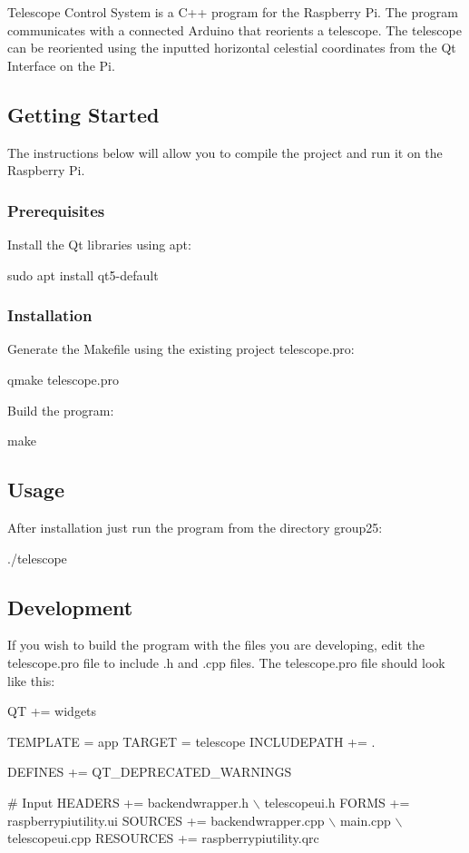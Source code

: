 Telescope Control System is a C++ program for the Raspberry Pi. The program communicates with a connected Arduino that reorients a telescope. The telescope can be reoriented using the inputted horizontal celestial coordinates from the Qt Interface on the Pi.

\subsection*{Getting Started}

The instructions below will allow you to compile the project and run it on the Raspberry Pi.

\subsubsection*{Prerequisites}

Install the Qt libraries using {\ttfamily apt}\+: 
\begin{DoxyCode}
sudo apt install qt5-default
\end{DoxyCode}


\subsubsection*{Installation}

Generate the {\ttfamily Makefile} using the existing project {\ttfamily telescope.\+pro}\+: 
\begin{DoxyCode}
qmake telescope.pro
\end{DoxyCode}


Build the program\+: 
\begin{DoxyCode}
make
\end{DoxyCode}


\subsection*{Usage}

After installation just run the program from the directory {\ttfamily group25}\+: 
\begin{DoxyCode}
./telescope
\end{DoxyCode}


\subsection*{Development}

If you wish to build the program with the files you are developing, edit the {\ttfamily telescope.\+pro} file to include {\ttfamily .h} and {\ttfamily .cpp} files. The {\ttfamily telescope.\+pro} file should look like this\+: 
\begin{DoxyCode}
QT += widgets

TEMPLATE = app
TARGET = telescope
INCLUDEPATH += .

DEFINES += QT\_DEPRECATED\_WARNINGS


# Input
HEADERS += backendwrapper.h \(\backslash\)
           telescopeui.h
FORMS += raspberrypiutility.ui
SOURCES += backendwrapper.cpp \(\backslash\)
           main.cpp \(\backslash\)
           telescopeui.cpp
RESOURCES += raspberrypiutility.qrc
\end{DoxyCode}


